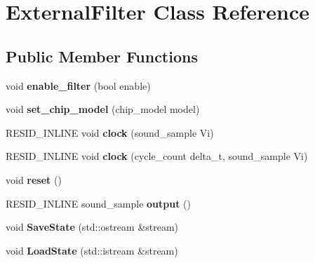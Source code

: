 \hypertarget{classExternalFilter}{\section{External\-Filter Class Reference}
\label{classExternalFilter}
}
\subsection*{Public Member Functions}
\begin{DoxyCompactItemize}
\item 
\hypertarget{classExternalFilter_a979e8c177fb5708d61a6d100deaa5520}{void {\bfseries enable\-\_\-filter} (bool enable)}\label{classExternalFilter_a979e8c177fb5708d61a6d100deaa5520}

\item 
\hypertarget{classExternalFilter_a54272a6415dedf7debc8679f747cbac4}{void {\bfseries set\-\_\-chip\-\_\-model} (chip\-\_\-model model)}\label{classExternalFilter_a54272a6415dedf7debc8679f747cbac4}

\item 
\hypertarget{classExternalFilter_ab4a9583fcdb8a388358d2260815e58af}{R\-E\-S\-I\-D\-\_\-\-I\-N\-L\-I\-N\-E void {\bfseries clock} (sound\-\_\-sample Vi)}\label{classExternalFilter_ab4a9583fcdb8a388358d2260815e58af}

\item 
\hypertarget{classExternalFilter_a76580de533494765339fbfce3f94386b}{R\-E\-S\-I\-D\-\_\-\-I\-N\-L\-I\-N\-E void {\bfseries clock} (cycle\-\_\-count delta\-\_\-t, sound\-\_\-sample Vi)}\label{classExternalFilter_a76580de533494765339fbfce3f94386b}

\item 
\hypertarget{classExternalFilter_afbc947336b5483e26a77f853d64994cb}{void {\bfseries reset} ()}\label{classExternalFilter_afbc947336b5483e26a77f853d64994cb}

\item 
\hypertarget{classExternalFilter_a2e13796ab51c1ad3feeaf1ffb380ff35}{R\-E\-S\-I\-D\-\_\-\-I\-N\-L\-I\-N\-E sound\-\_\-sample {\bfseries output} ()}\label{classExternalFilter_a2e13796ab51c1ad3feeaf1ffb380ff35}

\item 
\hypertarget{classExternalFilter_a0ddfa115089b95bb178843e4a0b8848f}{void {\bfseries Save\-State} (std\-::ostream \&stream)}\label{classExternalFilter_a0ddfa115089b95bb178843e4a0b8848f}

\item 
\hypertarget{classExternalFilter_ae168285599dd91aa463fc25c44b58b21}{void {\bfseries Load\-State} (std\-::istream \&stream)}\label{classExternalFilter_ae168285599dd91aa463fc25c44b58b21}

\end{DoxyCompactItemize}
